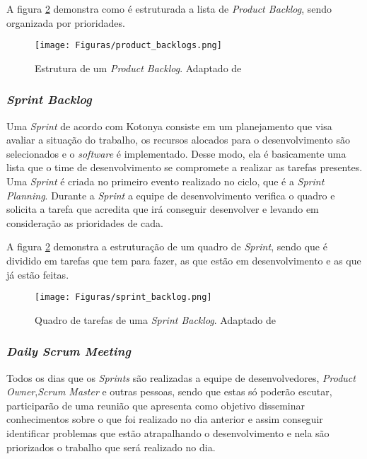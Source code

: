 {{A figura \ref{chave_para_refencia_cruzada} demonstra como é estruturada a lista de \textit{Product Backlog}, sendo organizada por prioridades. 

\begin{figure}[!htb]
  \centering 
  \texttt{[image: Figuras/product\_backlogs.png]}
  \caption{Estrutura de um \textit{Product Backlog}. Adaptado de \cite{0000:rafael}}
  \label{chave_para_refencia_cruzada}
\end{figure}

\subsubsection{\textit{Sprint Backlog}}
\noindent Uma \textit{Sprint} de acordo com Kotonya \cite{1997:Kotonya} consiste em um planejamento que visa avaliar a situação do trabalho, os recursos alocados para o desenvolvimento são selecionados e o \textit{software} é implementado. Desse modo, ela é basicamente uma lista que o time de desenvolvimento se compromete a realizar as tarefas presentes. Uma \textit{Sprint} é criada no primeiro evento realizado no ciclo, que é a \textit{Sprint Planning}. Durante a \textit{Sprint} a equipe de desenvolvimento verifica o quadro e solicita a tarefa que acredita que irá conseguir desenvolver e levando em consideração as prioridades de cada.

A figura \ref{chave_para_refencia_cruzada} demonstra a estruturação de um quadro de \textit{Sprint}, sendo que é dividido em tarefas que tem para fazer, as que estão em desenvolvimento e as que já estão feitas.

\begin{figure}[!htb]
  \centering 
  \texttt{[image: Figuras/sprint\_backlog.png]}
  \caption{Quadro de tarefas de uma \textit{Sprint Backlog}. Adaptado de \cite{0000:rafael}}
  \label{chave_para_refencia_cruzada}
\end{figure}

\subsubsection{\textit{Daily Scrum Meeting}}
\noindent Todos os dias que os \textit{Sprints} são realizadas a equipe de desenvolvedores, \textit{Product  Owner},\textit{Scrum Master} e outras pessoas, sendo que estas só poderão escutar, participarão de uma reunião que apresenta como objetivo disseminar conhecimentos sobre o que foi realizado no dia anterior e assim conseguir identificar problemas que estão atrapalhando o desenvolvimento e nela são priorizados o trabalho que será realizado no dia.

}}
